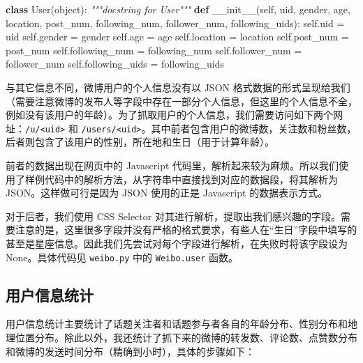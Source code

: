 \documentclass[a4paper,UTF8]{ctexart}
\newenvironment{Shaded}{}{}
\newcommand{\KeywordTok}[1]{\textcolor[rgb]{0.00,0.44,0.13}{\textbf{{#1}}}}
\newcommand{\CommentTok}[1]{\textcolor[rgb]{0.38,0.63,0.69}{\textit{{#1}}}}
\newcommand{\FunctionTok}[1]{\textcolor[rgb]{0.02,0.16,0.49}{{#1}}}
\newcommand{\VariableTok}[1]{\textcolor[rgb]{0.10,0.09,0.49}{{#1}}}
\newcommand{\OperatorTok}[1]{\textcolor[rgb]{0.40,0.40,0.40}{{#1}}}
\newcommand{\BuiltInTok}[1]{{#1}}
\newcommand{\NormalTok}[1]{{#1}}
\begin{document}
\begin{Shaded}
\begin{Highlighting}[]
\KeywordTok{class} \NormalTok{User(}\BuiltInTok{object}\NormalTok{):}
    \CommentTok{"""docstring for User"""}
    \KeywordTok{def} \FunctionTok{__init__}\NormalTok{(}\VariableTok{self}\NormalTok{, uid, gender, age, location, post_num, following_num,}
                 \NormalTok{follower_num, following_uids):}
        \VariableTok{self}\NormalTok{.uid }\OperatorTok{=} \NormalTok{uid}
        \VariableTok{self}\NormalTok{.gender }\OperatorTok{=} \NormalTok{gender}
        \VariableTok{self}\NormalTok{.age }\OperatorTok{=} \NormalTok{age}
        \VariableTok{self}\NormalTok{.location }\OperatorTok{=} \NormalTok{location}
        \VariableTok{self}\NormalTok{.post_num }\OperatorTok{=} \NormalTok{post_num}
        \VariableTok{self}\NormalTok{.following_num }\OperatorTok{=} \NormalTok{following_num}
        \VariableTok{self}\NormalTok{.follower_num }\OperatorTok{=} \NormalTok{follower_num}
        \VariableTok{self}\NormalTok{.following_uids }\OperatorTok{=} \NormalTok{following_uids}
\end{Highlighting}
\end{Shaded}

与其它信息不同，微博用户的个人信息没有以 JSON
格式数据的形式呈现给我们（需要注意微博的发布人等字段中存在一部分个人信息，但这里的个人信息不全，例如没有该用户的年龄）。为了抓取用户的个人信息，我们需要访问如下两个网址：\texttt{/u/\textless{}uid\textgreater{}}
和
\texttt{/users/\textless{}uid\textgreater{}}。其中前者包含用户的微博数，关注数和粉丝数，后者则包含了该用户的性别，所在地和生日（用于计算年龄）。

前者的数据出现在网页中的 Javascript
代码里，解析起来较为麻烦。所以我们使用了样例代码中的解析方法，从字符串中直接找到对应的数据段，将其解析为
JSON。这样做可行是因为 JSON 使用的正是 Javascript 的数据表示方式。

对于后者，我们使用 CSS Selector
对其进行解析，提取出我们感兴趣的字段。需要注意的是，这里很多字段并没有严格的格式要求，有些人在``生日''字段中填写的甚至是星座信息。因此我们先尝试对每个字段进行解析，在失败时将该字段设为
None。具体代码见 \texttt{weibo.py} 中的 \texttt{Weibo.user} 函数。

\subsection{用户信息统计}\label{ux7528ux6237ux4fe1ux606fux7edfux8ba1}

用户信息统计主要统计了话题关注者和话题参与者各自的年龄分布、性别分布和地理位置分布。除此以外，我还统计了抓下来的微博的转发数、评论数、点赞数分布和微博的发送时间分布（精确到小时），具体的步骤如下：
\end{document}
